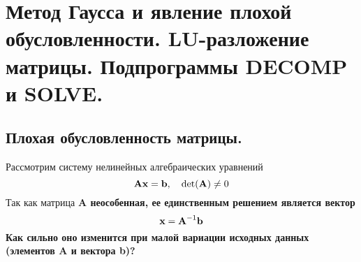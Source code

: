 \section{Метод Гаусса и явление плохой обусловленности. \textbf{LU}-разложение матрицы. Подпрограммы \textbf{DECOMP} и \textbf{SOLVE}.}\label{sec:ch20}

\subsection{Плохая обусловленность матрицы.}
Рассмотрим систему нелинейных алгебраических уравнений
\begin{equation}
    \bf{A}\bf{x} = \bf{b}, \quad \det (\bf{A}) \neq 0 \label{eq:nonlinear_algebraic_equation}
\end{equation}
Так как матрица \bf{A} неособенная, ее единственным решением является вектор
\begin{equation}
    \bf{x} = \bf{A}^{-1}\bf{b}
\end{equation}
Как сильно оно изменится при малой вариации исходных данных (элементов \bf{A} и вектора \bf{b})?

